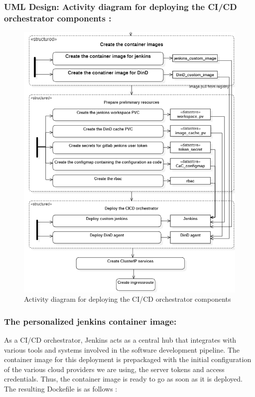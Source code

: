  
\subsubsection{UML Design: Activity diagram for deploying the CI/CD orchestrator components : }

\begin{figure}[H]\centering
\includegraphics[width=1.0\textwidth,angle=00]{assets/f44.png}
\caption{Activity diagram for deploying the CI/CD orchestrator components}
\label{fig:Activity diagram for deploying the CI/CD orchestrator components}
\end{figure}
 
\subsubsection{The personalized jenkins container image: }

As a CI/CD orchestrator, Jenkins acts as a central hub that integrates with various tools and systems involved in the software development pipeline. The container image for this deployment is prepackaged with the initial configuration of the various cloud providers we are using, the server tokens and access credentials. Thus, the container image is ready to go as soon as it is deployed. The resulting Dockefile is as follows : 


